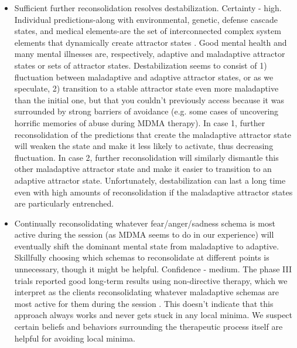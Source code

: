 \documentclass[12pt,letterpaper]{book}
\begin{document}
\begin{itemize}
	\item Sufficient further reconsolidation resolves destabilization. Certainty - high. Individual predictions-along with environmental, genetic, defense cascade states, and medical elements-are the set of interconnected complex system elements that dynamically create attractor states \cite{hayes2020complex,friston2010free}. Good mental health and many mental illnesses are, respectively, adaptive and maladaptive attractor states or sets of attractor states. Destabilization seems to consist of 1) fluctuation between maladaptive and adaptive attractor states, or as we speculate, 2) transition to a stable attractor state even more maladaptive than the initial one, but that you couldn't previously access because it was surrounded by strong barriers of avoidance (e.g. some cases of uncovering horrific memories of abuse during MDMA therapy). In case 1, further reconsolidation of the predictions that create the maladaptive attractor state will weaken the state and make it less likely to activate, thus decreasing fluctuation. In case 2, further reconsolidation will similarly dismantle this other maladaptive attractor state and make it easier to transition to an adaptive attractor state. Unfortunately, destabilization can last a long time even with high amounts of reconsolidation if the maladaptive attractor states are particularly entrenched.
	\item Continually reconsolidating whatever fear/anger/sadness schema is most active during the session (as MDMA seems to do in our experience) will eventually shift the dominant mental state from maladaptive to adaptive. Skillfully choosing which schemas to reconsolidate at different points is unnecessary, though it might be helpful. Confidence - medium. The phase III trials reported good long-term results using non-directive therapy, which we interpret as the clients reconsolidating whatever maladaptive schemas are most active for them during the session \cite{mitchellMDMAClinicalTrial2,mitchellMDMAClinicalTrial,mithoeferManual}. This doesn't indicate that this approach always works and never gets stuck in any local minima. We suspect certain beliefs and behaviors surrounding the therapeutic process itself are helpful for avoiding local minima.
\end{itemize}
\end{document}
